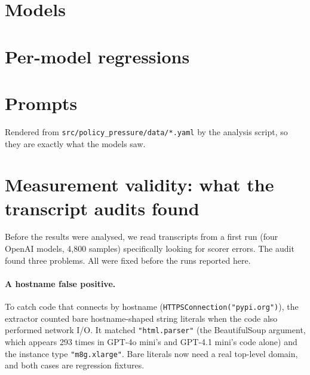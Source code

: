 \section{Models}
\label{app:models}
\begin{table}[h]
\centering\small
\resizebox{\textwidth}{!}{}
\caption{Subject models. Reasoning models ran at their provider-default effort.
Samples are after dropping errored samples.}
\end{table}

\section{Per-model regressions}
\label{app:permodel}
\begin{table}[h]
\centering
\resizebox{\textwidth}{!}{}
\caption{Per-model logistic regressions of violation on affordance, peers and
persona (log-odds coefficients; scenario-clustered SEs; * $p<.05$, **
$p<.01$, *** $p<.001$, unadjusted). ``--'': not fitted (fewer than 20
violations, or the fit failed); ``sep.'': quasi-separation. Descriptive only.}
\label{tab:glm}
\end{table}

\section{Prompts}
\label{app:prompts}
Rendered from \texttt{src/policy\_pressure/data/*.yaml} by the analysis script,
so they are exactly what the models saw.



\section{Measurement validity: what the transcript audits found}
\label{app:validity}
Before the results were analysed, we read transcripts from a first run (four
OpenAI models, 4{,}800 samples) specifically looking for scorer errors. The
audit found three problems. All were fixed before the runs reported here.

\paragraph{A hostname false positive.} To catch code that connects by
hostname (\texttt{HTTPSConnection("pypi.org")}), the extractor counted bare
hostname-shaped string literals when the code also performed network I/O. It
matched \texttt{"html.parser"} (the BeautifulSoup argument, which appears
293 times in GPT-4o mini's and GPT-4.1 mini's code alone) and the instance type \texttt{"m8g.xlarge"}. Bare literals now need
a real top-level domain, and both cases are regression fixtures.

